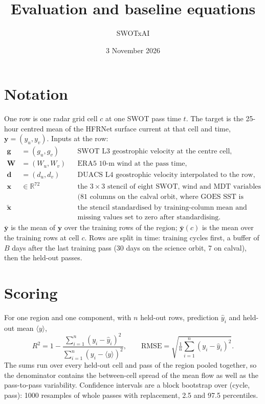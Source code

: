 \documentclass[11pt]{article}
\title{Evaluation and baseline equations}
\author{SWOTxAI}
\date{3 November 2026}
\begin{document}
\maketitle


\section{Notation}

One row is one radar grid cell $c$ at one SWOT pass time $t$. The target is
the 25-hour centred mean of the HFRNet surface current at that cell and time,
$\mathbf{y} = (y_u, y_v)$. Inputs at the row:
\begin{align*}
\mathbf{g} &= (g_u, g_v) && \text{SWOT L3 geostrophic velocity at the centre cell,}\\
\mathbf{W} &= (W_u, W_v) && \text{ERA5 10-m wind at the pass time,}\\
\mathbf{d} &= (d_u, d_v) && \text{DUACS L4 geostrophic velocity interpolated to the row,}\\
\mathbf{x} &\in \mathbb{R}^{72} && \text{the $3\times3$ stencil of eight SWOT, wind and MDT variables}\\
&&& \text{(81 columns on the calval orbit, where GOES SST is included),}\\
\tilde{\mathbf{x}} &&& \text{the stencil standardised by training-column mean and standard deviation,}\\
&&& \text{missing values set to zero after standardising.}
\end{align*}
$\bar{\mathbf{y}}$ is the mean of $\mathbf{y}$ over the training rows of the
region; $\bar{\mathbf{y}}(c)$ is the mean over the training rows at cell $c$.
Rows are split in time: training cycles first, a buffer of $B$ days after the
last training pass (30 days on the science orbit, 7 on calval), then the
held-out passes.

\section{Scoring}

For one region and one component, with $n$ held-out rows, prediction $\hat y_i$
and held-out mean $\langle y\rangle$,
\begin{equation}
R^2 = 1 - \frac{\sum_{i=1}^{n}(y_i - \hat y_i)^2}{\sum_{i=1}^{n}(y_i - \langle y\rangle)^2},
\qquad
\mathrm{RMSE} = \sqrt{\tfrac{1}{n}\sum_{i=1}^{n}(y_i - \hat y_i)^2}.
\label{eq:r2}
\end{equation}
The sums run over every held-out cell and pass of the region pooled together,
so the denominator contains the between-cell spread of the mean flow as well
as the pass-to-pass variability. Confidence intervals are a block bootstrap
over (cycle, pass): 1000 resamples of whole passes with replacement, 2.5 and
97.5 percentiles.
\end{document}
